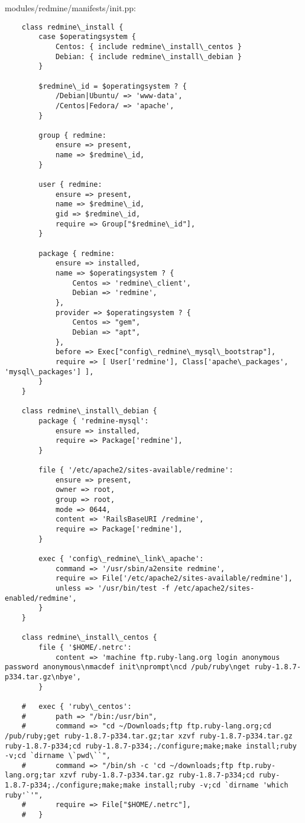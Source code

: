modules/redmine/manifests/init.pp:
\begin{verbatim}
	class redmine\_install {
		case $operatingsystem {
			Centos: { include redmine\_install\_centos }
			Debian: { include redmine\_install\_debian }
		}

		$redmine\_id = $operatingsystem ? {
			/Debian|Ubuntu/ => 'www-data',
			/Centos|Fedora/ => 'apache',
		}

		group { redmine:
			ensure => present,
			name => $redmine\_id,
		}	

		user { redmine:
			ensure => present,
			name => $redmine\_id,
			gid => $redmine\_id,
			require => Group["$redmine\_id"],
		}

		package { redmine:
			ensure => installed,
			name => $operatingsystem ? {
				Centos => 'redmine\_client',
				Debian => 'redmine',
			},
			provider => $operatingsystem ? {
				Centos => "gem",
				Debian => "apt",
			},
			before => Exec["config\_redmine\_mysql\_bootstrap"],
			require => [ User['redmine'], Class['apache\_packages', 'mysql\_packages'] ],
		}
	}

	class redmine\_install\_debian {
		package { 'redmine-mysql':
			ensure => installed,
			require => Package['redmine'],
		}

		file { '/etc/apache2/sites-available/redmine':
			ensure => present,
			owner => root,
			group => root,
			mode => 0644,
			content => 'RailsBaseURI /redmine',
			require => Package['redmine'],
		}

		exec { 'config\_redmine\_link\_apache':
			command => '/usr/sbin/a2ensite redmine',
			require => File['/etc/apache2/sites-available/redmine'],
			unless => '/usr/bin/test -f /etc/apache2/sites-enabled/redmine',
		}
	}

	class redmine\_install\_centos {
		file { '$HOME/.netrc':
			content => 'machine ftp.ruby-lang.org login anonymous password anonymous\nmacdef init\nprompt\ncd /pub/ruby\nget ruby-1.8.7-p334.tar.gz\nbye',
		}

	#	exec { 'ruby\_centos':
	#		path => "/bin:/usr/bin",
	#		command => "cd ~/Downloads;ftp ftp.ruby-lang.org;cd /pub/ruby;get ruby-1.8.7-p334.tar.gz;tar xzvf ruby-1.8.7-p334.tar.gz ruby-1.8.7-p334;cd ruby-1.8.7-p334;./configure;make;make install;ruby -v;cd `dirname \`pwd\``",
	#		command => "/bin/sh -c 'cd ~/downloads;ftp ftp.ruby-lang.org;tar xzvf ruby-1.8.7-p334.tar.gz ruby-1.8.7-p334;cd ruby-1.8.7-p334;./configure;make;make install;ruby -v;cd `dirname 'which ruby'`'",
	#		require => File["$HOME/.netrc"],
	#	}


\end{verbatim}
